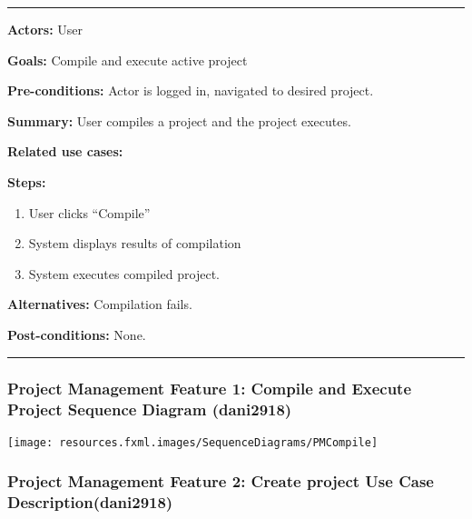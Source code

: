 \documentclass[twoside,letterpaper]{article}
\begin{document}
\bigskip
\vspace{2pt}
\hrule
\vspace{8pt}
 \textbf{Actors:} User \newline
 
\noindent \textbf{Goals:} Compile and execute active project\newline

 \noindent \textbf{Pre-conditions:} Actor is logged in, navigated to desired project.  \newline
 
\noindent \textbf{Summary:} User compiles a project and the project executes.\newline

\noindent \textbf{Related use cases:} \newline

\noindent \textbf{Steps:} \begin{enumerate}
  \item User clicks ``Compile''
  \item System displays results of compilation
  \item System executes compiled project.
 \end{enumerate}
 \noindent \textbf{Alternatives:} Compilation fails. \newline
 
\noindent  \textbf{Post-conditions:} None. \newline
 
\vspace{8pt}
\hrule
\vspace{20pt}
\newpage
\subsubsection[Project Management Feature 1: Sequence Diagram 1: Compile and execute project (dani2918)]{\rmfamily\bfseries\color{black}
	Project Management Feature 1: Compile and Execute Project Sequence Diagram (dani2918) }

\bigskip

\texttt{[image: resources.fxml.images/SequenceDiagrams/PMCompile]}
\label{pm:sd1}

\newpage


\newpage

\subsubsection[Project Management Feature 2: Create project Use Case Description (dani2918)]{\rmfamily\bfseries\color{black}
	Project Management Feature 2: Create project Use Case Description(dani2918)}
\hypertarget{RefHeading22059017292}{}
\label{pm:uc3}
\bigskip
\end{document}
